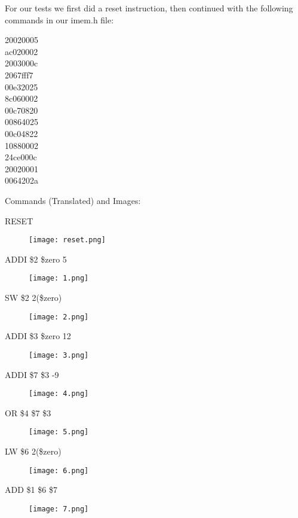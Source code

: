 \documentclass[paper=letter, fontsize=11pt]{scrartcl} %
\numberwithin{equation}{section}
\numberwithin{figure}{section}
\numberwithin{table}{section}
\begin{document}
\begin{center}
For our tests we first did a reset instruction, then continued with the following commands in our imem.h file:
\end{center}
20020005\\
ac020002\\
2003000c\\
2067fff7\\
00e32025\\
8c060002\\
00c70820\\
00864025\\
00c04822\\
10880002\\
24ce000c\\
20020001\\
0064202a\\

\begin{center}
Commands (Translated) and Images:
\end{center}
RESET
\begin{figure}[H]
	\centering
		\texttt{[image: reset.png]}
	\label{fig:reset}
\end{figure}
\pagebreak
ADDI \$2 \$zero 5
\begin{figure}[H]
	\centering
		\texttt{[image: 1.png]}
	\label{fig:0}
\end{figure}

SW \$2 2(\$zero)
\begin{figure}[H]
	\centering
		\texttt{[image: 2.png]}
	\label{fig:tests}
\end{figure}
\pagebreak
ADDI \$3 \$zero 12		
\begin{figure}[H]
	\centering
		\texttt{[image: 3.png]}
	\label{fig:tests}
\end{figure}

ADDI \$7 \$3 -9		
\begin{figure}[H]
	\centering
		\texttt{[image: 4.png]}
	\label{fig:tests}
\end{figure}
\pagebreak
OR \$4 \$7 \$3		
\begin{figure}[H]
	\centering
		\texttt{[image: 5.png]}
	\label{fig:tests}
\end{figure}

LW \$6 2(\$zero)	
\begin{figure}[H]
	\centering
		\texttt{[image: 6.png]}
	\label{fig:tests}
\end{figure}
\pagebreak
ADD \$1 \$6 \$7	
\begin{figure}[H]
	\centering
		\texttt{[image: 7.png]}
	\label{fig:tests}
\end{figure}
\end{document}
